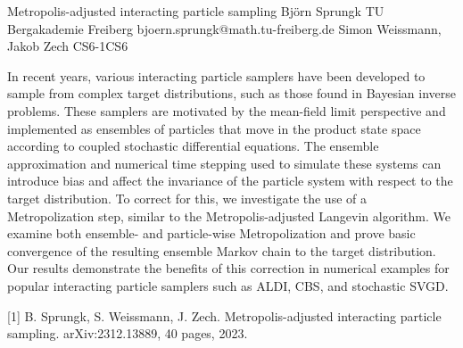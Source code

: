 \begin{talk}
  {Metropolis-adjusted interacting particle sampling}%
  {Bj\"orn Sprungk}%
  {TU Bergakademie Freiberg}%
  {bjoern.sprungk@math.tu-freiberg.de}%
  {Simon Weissmann, Jakob Zech}%
{}{}{CS6-1}{CS6}


In recent years, various interacting particle samplers have been developed to sample from complex target distributions, such as those found in Bayesian inverse problems. These samplers are motivated by the mean-field limit perspective and implemented as ensembles of particles that move in the product state space according to coupled stochastic differential equations. The ensemble approximation and numerical time stepping used to simulate these systems can introduce bias and affect the invariance of the particle system with respect to the target distribution. To correct for this, we investigate the use of a Metropolization step, similar to the Metropolis-adjusted Langevin algorithm. We examine both ensemble- and particle-wise Metropolization and prove basic convergence of the resulting ensemble Markov chain to the target distribution. Our results demonstrate the benefits of this correction in numerical examples for popular interacting particle samplers such as ALDI, CBS, and stochastic SVGD.				
				
\medskip

[1] B. Sprungk, S. Weissmann, J. Zech. Metropolis-adjusted interacting particle sampling. arXiv:2312.13889, 40 pages, 2023.
\end{talk}

